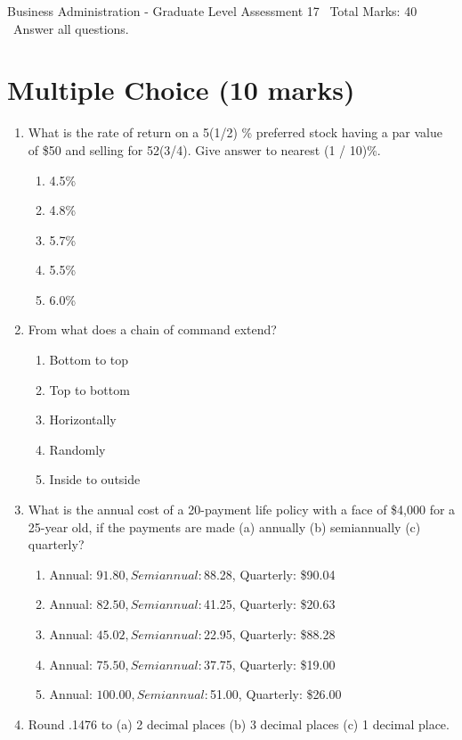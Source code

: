 \documentclass[12pt]{article}
\begin{document}
\begin{center}
Business Administration - Graduate Level Assessment 17 \
Total Marks: 40 \
Answer all questions.
\end{center}

\section*{Multiple Choice (10 marks)}
\begin{enumerate}[label=\arabic*.]
\item What is the rate of return on a 5(1/2) \% preferred stock having a par value of \$50 and selling for 52(3/4). Give answer to nearest (1 / 10)\%.
\begin{enumerate}[label=(\alph*)]
    \item 4.5\%
    \item 4.8\%
    \item 5.7\%
    \item 5.5\%
    \item 6.0\%
\end{enumerate}
\item From what does a chain of command extend?
\begin{enumerate}[label=(\alph*)]
    \item Bottom to top
    \item Top to bottom
    \item Horizontally
    \item Randomly
    \item Inside to outside
\end{enumerate}
\item What is the annual cost of a 20-payment life policy with a face of \$4,000 for a 25-year old, if the payments are made (a) annually (b) semiannually (c) quarterly?
\begin{enumerate}[label=(\alph*)]
    \item Annual: $91.80, Semiannual: $88.28, Quarterly: \$90.04
    \item Annual: $82.50, Semiannual: $41.25, Quarterly: \$20.63
    \item Annual: $45.02, Semiannual: $22.95, Quarterly: \$88.28
    \item Annual: $75.50, Semiannual: $37.75, Quarterly: \$19.00
    \item Annual: $100.00, Semiannual: $51.00, Quarterly: \$26.00
\end{enumerate}
\item Round .1476 to (a) 2 decimal places (b) 3 decimal places (c) 1 decimal place.

\end{enumerate}
\end{document}
